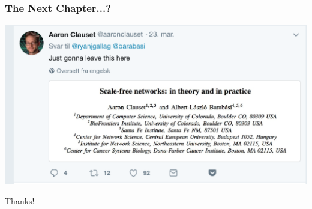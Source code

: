 \documentclass{beamer}
\begin{document}
		
		\begin{frame}\frametitle{The Next Chapter...?}
			\centering
			\includegraphics[width=\textwidth]{twitter_reconciliation}
		\end{frame}
	
		
		\begin{frame}[standout]
		  	Thanks!
		\end{frame}
	
\end{document}
